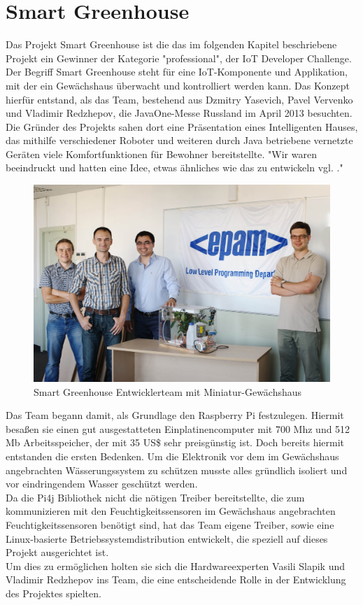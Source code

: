 \section{Smart Greenhouse}\label{s:SmartGreenhouse}

Das Projekt Smart Greenhouse ist die das im folgenden Kapitel  beschriebene Projekt ein Gewinner der Kategorie "professional", der IoT Developer Challenge. 
Der Begriff Smart Greenhouse steht für eine \ac{IoT}-Komponente und Applikation, mit der ein Gewächshaus überwacht und kontrolliert werden kann. Das Konzept hierfür entstand, als das Team, bestehend aus Dzmitry Yasevich, Pavel Vervenko und Vladimir Redzhepov, die JavaOne-Messe Russland im April 2013 besuchten. Die Gründer des Projekts sahen dort eine Präsentation eines Intelligenten Hauses, das mithilfe verschiedener Roboter und weiteren durch Java betriebene vernetzte Geräten viele Komfortfunktionen für Bewohner bereitstellte. "Wir waren beeindruckt und hatten eine Idee, etwas ähnliches wie das zu entwickeln vgl. \cite{z:smartgreenhouse}."

\begin{figure}[H] 
	\centering
	\includegraphics[scale=0.1]{Bilder/smartgreenhouse}
	\caption{Smart Greenhouse Entwicklerteam mit Miniatur-Gewächshaus\cite{i:smartgreenhouse}}
	\label{f:smartgreenhouse}
\end{figure}

Das Team begann damit, als Grundlage den Raspberry Pi festzulegen. Hiermit besaßen sie einen gut ausgestatteten Einplatinencomputer mit 700 \ac{Mhz} und 512 Mb Arbeitsspeicher, der mit 35 US\$ sehr preisgünstig ist. Doch bereits hiermit entstanden die ersten Bedenken. Um die Elektronik vor dem im Gewächshaus angebrachten Wässerungssystem zu schützen musste alles gründlich isoliert und vor eindringendem Wasser geschützt werden.\\
Da die Pi4j Bibliothek nicht die nötigen Treiber bereitstellte, die zum kommunizieren mit den Feuchtigkeitssensoren im Gewächshaus angebrachten Feuchtigkeitssensoren benötigt sind, hat das Team eigene Treiber, sowie eine Linux-basierte Betriebssystemdistribution entwickelt, die speziell auf dieses Projekt ausgerichtet ist.\\
Um dies zu ermöglichen holten sie sich die Hardwareexperten Vasili Slapik und Vladimir Redzhepov ins Team, die eine entscheidende Rolle in der Entwicklung des Projektes spielten.

